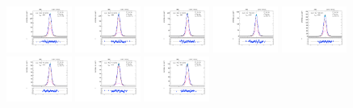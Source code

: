 \begin{figure}[htb]
\includegraphics[width=0.19\textwidth]{plots/Appendix_Recoil_Fits/ZmmMC_PF_13TeV_2G/pfu2fit_16.pdf}
\includegraphics[width=0.19\textwidth]{plots/Appendix_Recoil_Fits/ZmmMC_PF_13TeV_2G/pfu2fit_17.pdf}
\includegraphics[width=0.19\textwidth]{plots/Appendix_Recoil_Fits/ZmmMC_PF_13TeV_2G/pfu2fit_18.pdf}
\includegraphics[width=0.19\textwidth]{plots/Appendix_Recoil_Fits/ZmmMC_PF_13TeV_2G/pfu2fit_19.pdf}
\includegraphics[width=0.19\textwidth]{plots/Appendix_Recoil_Fits/ZmmMC_PF_13TeV_2G/pfu2fit_20.pdf}
\includegraphics[width=0.19\textwidth]{plots/Appendix_Recoil_Fits/ZmmMC_PF_13TeV_2G/pfu2fit_21.pdf}
\includegraphics[width=0.19\textwidth]{plots/Appendix_Recoil_Fits/ZmmMC_PF_13TeV_2G/pfu2fit_22.pdf}
\includegraphics[width=0.19\textwidth]{plots/Appendix_Recoil_Fits/ZmmMC_PF_13TeV_2G/pfu2fit_23.pdf}

\end{figure}
